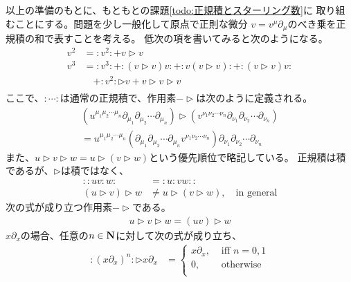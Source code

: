 	以上の準備のもとに、もともとの課題\ref{todo:正規積とスターリング数}に
	取り組むことにする。問題を少し一般化して原点で正則な微分
	$v=v^\mu\partial_\mu$のべき乗を正規積の和で表すことを考える。
	低次の項を書いてみると次のようになる。
	\begin{equation*}\begin{split} %
		v^2 &= :v^2: + v\rhd v \\
		v^3 &= :v^3: + :(v\rhd v)v: + :v(v\rhd v): + :(v\rhd v)v: \\
		&\quad + :v^2:\rhd v + v\rhd v\rhd v \\
	\end{split}\end{equation*} %
	ここで、$:\cdots:$は通常の正規積で、作用素$-\rhd$は次のように定義される。
	\begin{equation*}\begin{split} %
		(u^{\mu_1\mu_2\cdots\mu_n}
			\partial_{\mu_1}\partial_{\mu_2}\cdots\partial_{\mu_n})\rhd
			(v^{\nu_1\nu_2\cdots\nu_n}
			\partial_{\nu_1}\partial_{\nu_2}\cdots\partial_{\nu_n}) \\
		= u^{\mu_1\mu_2\cdots\mu_n}
		 (\partial_{\mu_1}\partial_{\mu_2}\cdots\partial_{\mu_n}
			v^{\nu_1\nu_2\cdots\nu_n})
			\partial_{\nu_1}\partial_{\nu_2}\cdots\partial_{\nu_n} 
	\end{split}\end{equation*} %
	また、$u\rhd v\rhd w=u\rhd(v\rhd w)$という優先順位で略記している。
	正規積は積であるが、$\rhd$は積ではなく、
	\begin{equation*}\begin{split} %
		::uv:w: &= :u:vw:: \\
		(u\rhd v)\rhd w &\neq u\rhd (v\rhd w),\quad\text{in general}
	\end{split}\end{equation*} %
	次の式が成り立つ作用素$-\rhd$である。
	\begin{equation*}\begin{split} %
		u\rhd v\rhd w = (uv)\rhd w
	\end{split}\end{equation*} %
	$x\partial_x$の場合、任意の$n\in {\mathbf{N}}$に対して次の式が成り立ち、
	\begin{equation*}\begin{split} %
		:(x\partial_x)^n:\rhd x\partial_x &= \begin{cases}
			x\partial_x, &\text{ iff } n=0,1 \\
			0, &\text{ otherwise } \\
		\end{cases} \\
	\end{split}\end{equation*} %
